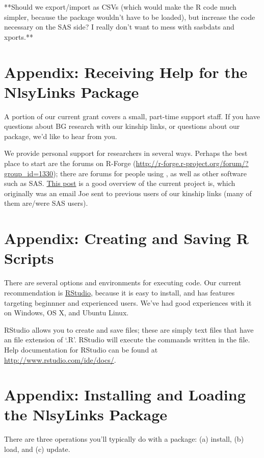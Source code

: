 \documentclass{article}\usepackage[]{graphicx}\usepackage[]{color}
\begin{document}
**Should we export/import as CSVs (which would make the R code much simpler, because the  package wouldn't have to be loaded), but increase the code necessary on the SAS side? I really don't want to mess with sasbdats and xports.**

\appendix
\section{Appendix: Receiving Help for the NlsyLinks Package}
\label{sec:ReceivingHelp} A portion of our current grant covers a small, part-time support
staff.  If you have questions about BG research with our kinship links, or
questions about our package, we'd like to hear from you.

We provide personal support for researchers in several ways.  Perhaps the best
place to start are the forums on R-Forge
(\url{http://r-forge.r-project.org/forum/?group_id=1330}); there are forums for
people using \R{}, as well as other software such as SAS.  \href{https://r-forge.r-project.org/forum/forum.php?thread_id=4537&forum_id=4266&group_id=1330}{This
post} is a good overview of the current project is, which originally was an
email Joe sent to previous users of our kinship links (many of them are/were SAS
users).

\section{Appendix: Creating and Saving R Scripts}
\label{sec:RScripts} There are several options and environments for executing \R{} code.  Our current
recommendation is \href{http://rstudio.org/}{RStudio}, because it is easy to
install, and has features targeting beginnner and experienced \R{} users. 
We've had good experiences with it on Windows, OS X, and Ubuntu Linux.

RStudio allows you to create and save \R{} files; these are simply text files
that have an file extension of `.R'.  RStudio will execute the commands written
in the file.  Help documentation for RStudio can be found at
\url{http://www.rstudio.com/ide/docs/}.

\section{Appendix: Installing and Loading the NlsyLinks Package} \label{sec:InstallingPackage}
There are three operations you'll typically do with a package: (a) install, (b) load, and (c) update.
\end{document}
